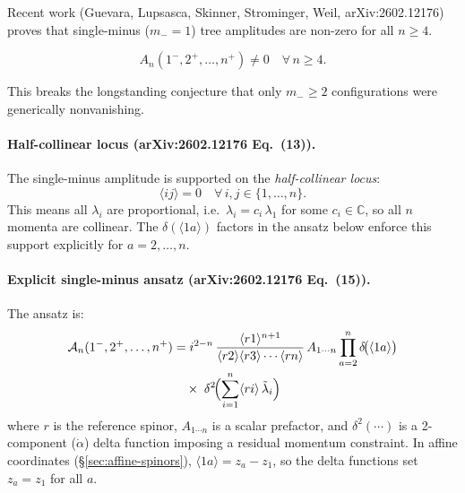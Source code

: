 Recent work (Guevara, Lupsasca, Skinner, Strominger, Weil, arXiv:2602.12176) proves that single-minus ($m_-=1$) tree amplitudes are non-zero for all $n\ge 4$.

\begin{equation}
A_n(1^-, 2^+, \ldots, n^+) \neq 0 \quad \forall\, n \ge 4.
\end{equation}

This breaks the longstanding conjecture that only $m_-\ge 2$ configurations were generically nonvanishing.

\paragraph{Half-collinear locus (arXiv:2602.12176 Eq.~(13)).}
The single-minus amplitude is supported on the \emph{half-collinear locus}:
\begin{equation}
\langle ij\rangle = 0 \quad \forall\, i,j \in \{1,\dots,n\}.
\label{eq:half-collinear-locus}
\end{equation}
This means all $\lambda_i$ are proportional, i.e.\ $\lambda_i = c_i\,\lambda_1$ for some $c_i\in\mathbb{C}$, so all $n$ momenta are collinear. The $\delta(\langle 1a\rangle)$ factors in the ansatz below enforce this support explicitly for $a=2,\dots,n$.

\paragraph{Explicit single-minus ansatz (arXiv:2602.12176 Eq.~(15)).}
The ansatz is:
\begin{align}
\mathcal{A}_n(1^-,2^+,\dots,n^+)
&= i^{2-n}\, \frac{\langle r 1\rangle^{n+1}}{\langle r 2\rangle \langle r 3\rangle \cdots \langle rn\rangle}\, A_{1\cdots n}
\prod_{a=2}^{n} \delta\!\bigl(\langle 1 a\rangle\bigr) \notag\\
&\quad \times\; \delta^2\!\Bigl(\sum_{i=1}^n \langle r i\rangle\, \tilde\lambda_i\Bigr)
\label{eq:single-minus-ansatz}
\end{align}
where $r$ is the reference spinor, $A_{1\cdots n}$ is a scalar prefactor, and $\delta^2(\cdots)$ is a 2-component ($\dot\alpha$) delta function imposing a residual momentum constraint. In affine coordinates (\S\ref{sec:affine-spinors}), $\langle 1a\rangle = z_a - z_1$, so the delta functions set $z_a = z_1$ for all $a$.

